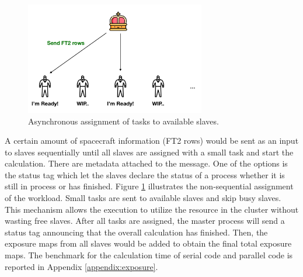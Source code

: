 \begin{figure}[h!]
    \centering
    \includegraphics[width=0.7\textwidth]{content/methodology/figures/ms3}
    \caption{Asynchronous assignment of tasks to available slaves.}
    \label{fig:ms3}
\end{figure}

A certain amount of spacecraft information (FT2 rows)
would be sent as an input to slaves sequentially
until all slaves are assigned with a small task
and start the calculation.
There are metadata attached
to the message. 
One of the options is the status tag
which let the slaves declare the status of a process
whether it is still in process or has finished.
Figure \ref{fig:ms3} illustrates 
the non-sequential assignment of the workload.
Small tasks are sent to available slaves and skip busy slaves.
This mechanism allows the execution to utilize 
the resource in the cluster without wasting
free slaves. After all tasks are assigned,
the master process will send a status tag announcing
that the overall calculation has finished.
Then, the exposure maps from all slaves would be added
to obtain the final total exposure maps.
The benchmark for the calculation time of serial code
and parallel code is reported in Appendix \ref{appendix:exposure}.




